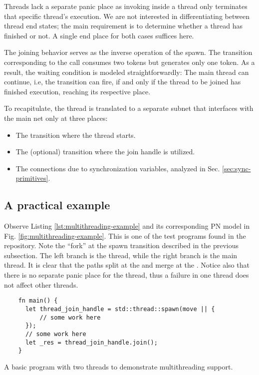 Threads lack a separate panic place
as invoking  inside a thread
only terminates that specific thread's execution.
We are not interested in differentiating between thread end states;
the main requirement is to determine whether a thread has finished or not.
A single end place for both cases suffices here.

The joining behavior serves as the inverse operation of the spawn.
The transition corresponding to the  call consumes two tokens
but generates only one token.
As a result, the waiting condition is modeled straightforwardly:
The main thread can continue, i.e, the  transition can fire,
if and only if the thread to be joined has finished execution,
reaching its respective  place.

To recapitulate, the thread is translated to a separate subnet
that interfaces with the main net only at three places:

\begin{itemize}
  \item The  transition where the thread starts.
  \item The (optional)  transition where the join handle is utilized.
  \item The connections due to synchronization variables, analyzed in Sec. \ref{sec:sync-primitives}.
\end{itemize}

\subsection{A practical example}

Observe Listing \ref{lst:multithreading-example}
and its corresponding \acrshort{PN} model in Fig. \ref{fig:multithreading-example}.
This is one of the test programs found in the repository.
Note the ``fork'' at the spawn transition described in the previous subsection.
The left branch is the thread, while the right branch is the main thread.
It is clear that the paths split at the  and merge
at the .
Notice also that there is no separate panic place for the thread,
thus a failure in one thread does not affect other threads.

\begin{listing}[!htb]
  \begin{verbatim}
    fn main() {
      let thread_join_handle = std::thread::spawn(move || {
          // some work here
      });
      // some work here
      let _res = thread_join_handle.join();
    }  
  \end{verbatim}
  \caption{A basic program with two threads to demonstrate multithreading support.}
  \label{lst:multithreading-example}
\end{listing}


